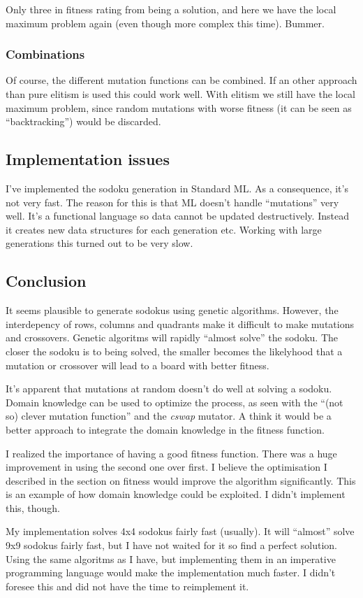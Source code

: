 \documentclass{article}
\begin{document}
Only three in fitness rating from being a solution, and here we have
the local maximum problem again (even though more complex this
time). Bummer.

\subsubsection{Combinations}

Of course, the different mutation functions can be combined. If 
an other approach than pure elitism is used this could work well.
With elitism we still have the local maximum problem, since 
random mutations with worse fitness (it can be seen  as
``backtracking'') would be discarded.

\subsection{Implementation issues}
I've implemented the sodoku generation in Standard ML.
As a consequence, it's not very fast. The reason for
this is that ML doesn't handle ``mutations'' very well.
It's a functional language so data cannot be updated 
destructively. Instead it creates new data structures
for each generation etc. Working with large generations
this turned out to be very slow.

\subsection{Conclusion}

It seems plausible to generate sodokus using genetic algorithms.
However, the interdepency of rows, columns and quadrants make it difficult
to make mutations and crossovers. Genetic algoritms will rapidly
``almost solve'' the sodoku. The closer the sodoku is to being solved,
the smaller becomes the likelyhood that a mutation or crossover will 
lead to a board with better fitness. 

It's apparent that mutations at random doesn't do well at solving a
sodoku. Domain knowledge can be used to optimize the process, as seen
with the ``(not so) clever mutation function'' and the \emph{cswap}
mutator. A think it would be a better approach to integrate the domain
knowledge in the fitness function. 

I realized the importance of having a good fitness function. There was 
a huge improvement in using the second one over first. I believe the 
optimisation I described in the section on fitness would improve the 
algorithm significantly. This is an example of how domain knowledge could be
exploited. I didn't implement this, though.

My implementation solves 4x4 sodokus fairly fast (usually). It
will ``almost'' solve 9x9 sodokus fairly fast, but I have not waited
for it so find a perfect solution. Using the same algoritms as I have,
but implementing them in an imperative programming language would 
make the implementation much faster. I didn't foresee this and did not 
have the time to reimplement it. 
\end{document}
